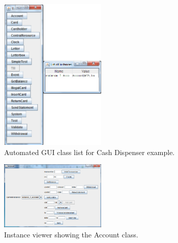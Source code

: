 \begin{figure}[!ht]
\begin{center}
  \includegraphics[width=0.45\textwidth]{screenDumps/guibuilder-instances}
  \caption[labelInTOC]{Automated GUI class list for Cash Dispenser example.}
  \label{fig:guibuilder-instances}
\end{center}
\end{figure}

\begin{figure}[!ht]
\begin{center}
  \includegraphics[width=0.45\textwidth]{screenDumps/guibuilder-account}
  \caption[labelInTOC]{Instance viewer showing the Account class.}
  \label{fig:guibuilder-account}
\end{center}
\end{figure}
